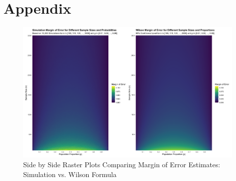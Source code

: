 \documentclass{article}\usepackage[]{graphicx}\usepackage[]{xcolor}
\begin{document}
\newpage
\onecolumn
\section{Appendix}
\begin{figure}[!htbp]
    \centering
    \includegraphics[width=.97\textwidth, trim=0 0 0 0, clip]{Combined.png}
    \caption{Side by Side Raster Plots Comparing Margin of Error Estimates: Simulation vs. Wilson Formula}
\end{figure}
\end{document}
